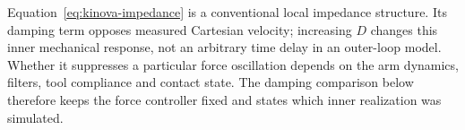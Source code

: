 Equation~\eqref{eq:kinova-impedance} is a conventional local impedance structure. Its damping term opposes measured Cartesian velocity; increasing $D$ changes this inner mechanical response, not an arbitrary time delay in an outer-loop model. Whether it suppresses a particular force oscillation depends on the arm dynamics, filters, tool compliance and contact state. The damping comparison below therefore keeps the force controller fixed and states which inner realization was simulated.

